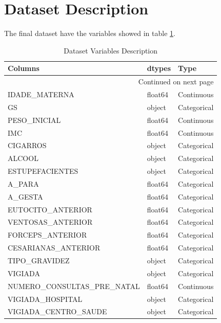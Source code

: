\documentclass{article}
\begin{document}
\section{Dataset Description}

The final dataset have the variables showed in table \ref{tab:desc}.\\
\begin{longtable}{lll}
\caption{Dataset Variables Description}\label{tab:desc}\\
\toprule
                       Columns &   dtypes &         Type \\
\midrule
\endhead
\midrule
\multicolumn{3}{r}{{Continued on next page}} \\
\midrule
\endfoot

\bottomrule
\endlastfoot
                 IDADE\_MATERNA &  float64 &   Continuous \\
                            GS &   object &  Categorical \\
                  PESO\_INICIAL &  float64 &   Continuous \\
                           IMC &  float64 &   Continuous \\
                      CIGARROS &   object &  Categorical \\
                        ALCOOL &   object &  Categorical \\
               ESTUPEFACIENTES &   object &  Categorical \\
                        A\_PARA &  float64 &  Categorical \\
                       A\_GESTA &  float64 &  Categorical \\
             EUTOCITO\_ANTERIOR &  float64 &  Categorical \\
             VENTOSAS\_ANTERIOR &  float64 &  Categorical \\
              FORCEPS\_ANTERIOR &  float64 &  Categorical \\
           CESARIANAS\_ANTERIOR &  float64 &  Categorical \\
                 TIPO\_GRAVIDEZ &   object &  Categorical \\
                       VIGIADA &   object &  Categorical \\
    NUMERO\_CONSULTAS\_PRE\_NATAL &  float64 &   Continuous \\
              VIGIADA\_HOSPITAL &   object &  Categorical \\
          VIGIADA\_CENTRO\_SAUDE &   object &  Categorical \\

\end{longtable}
\end{document}
